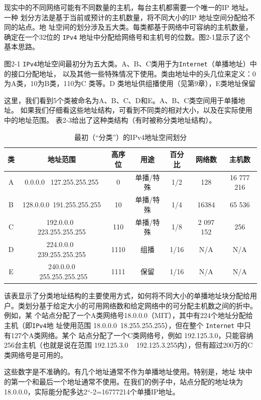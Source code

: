 现实中的不同网络可能有不同数量的主机，每台主机都需要一个唯一的IP 地址。一种
划分方法是基于当前或预计的主机数量，将不同大小的IP 地址空间分配给不同的站点。地
址空间的划分涉及五大类。每类都基于网络中可容纳的主机数量，确定在一个32位的 \verb|IPv4|
地址中分配给网络号和主机号的位数。图2-1显示了这个基本思路。

图2-1 \verb|IPv4|地址空间最初分为五大类。A、B、C类用于为\verb|Internet|（单播地址）中的接口分配地址，
以及其他一些特殊情况下使用。类由地址中的头几位来定义：0为A类，10为B类，110为C
类等。D 类地址供组播使用（见第9章），E类地址保留

这里，我们看到5个类被命名为A、B、C、D和E。A、B、C类空间用于单播地址。
如果我们仔细看这些地址结构，可看到不同类的相对大小，以及在实际使用中的地址范围。
表2-3给出了这种类结构（有时被称分类地址结构）。

\begin{table}[]
    \centering
    \caption{最初（“分类”）的IPv4地址空间划分}
    \begin{tabular}{c|c|c|c|c|c|c}
        \hline
        类	&	地址范围	&	高序位	&	用途	&	百分比	&	网络数	&	主机数 \\ \hline
        A	&	0.0.0.0~ 127.255.255.255	&	0	&	单播/特殊	&	1/2	&	128	&	16 777 216 \\ \hline
        B	&	128.0.0.0~191.255.255.255	&	10	&	单播/特殊	&	1/4	&	16384	&	65 536 \\ \hline
        C	&	192.0.0.0~ 223.255.255.255	&	110	&	单播/特殊	&	1/8	&	2 097 152	&	256 \\ \hline
        D	&	224.0.0.0~ 239.255.255.255	&	1110	&	组播	&	1/16	&	N/A	&	N/A \\ \hline
        E	&	240.0.0.0 ~255.255.255.255	&	1111	&	保留	&	1/16	&	N/A	&	N/A \\ \hline
    \end{tabular}
\end{table}

该表显示了分类地址结构的主要使用方式，如何将不同大小的单播地址块分配给用
户。类划分基于给定大小的可用网络数和给定网络中的可分配主机数之间的折中。例如，某
个站点分配了一个A类网络号18.0.0.0（MIT），其中有224个地址分配给主机（即\verb|IPv4|地
址使用范围 18.0.0.0~18.255.255.255），但在整个 \verb|Internet| 中只有127个A类网络。某个
站点分配了一个C类网络号，例如 192.125.3.0，只能容纳256台主机（也就是说在范围
192.125.3.0 ~ 192.125.3.255内），但有超过200万的C类网络号是可用的。

\begin{tcolorbox}
    这些数字是不准确的。有几个地址通常不作为单播地址使用。特别是，地址
    块中的第一个和最后一个地址通常不使用。在我们的例子中，站点分配的地址块为
    18.0.0.0，实际能分配多达2“-2=16777214个单播IP地址。
\end{tcolorbox}

